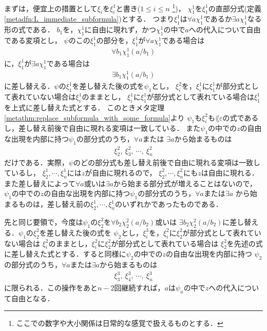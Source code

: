 	まずは，便宜上の措置として$\xi_{i}$を$\xi_{i}^{1}$と書き($1 \leq i \leq n$
	\footnote{
		ここでの数字や大小関係は日常的な感覚で扱えるものとする．
	})，
	$\chi_{1}^{1}$を$\xi_{1}^{1}$の直部分式(定義\ref{metadfn:L_immediate_subformula})とする．
	つまり$\xi_{1}^{1}$は$\forall a \chi_{1}^{1}$であるか$\exists a \chi_{1}^{1}$なる形の式である．
	$b_{1}$を，$\chi_{1}^{1}$に自由に現れず，かつ$\chi_{1}^{1}$の中で$a$への代入について自由である変項とし，
	$\psi$のこの$\xi_{1}^{1}$の部分を，$\xi_{1}^{1}$が$\forall a \chi_{1}^{1}$である場合は
	\begin{align}
		\forall b_{1} \chi_{1}^{1}(a/b_{1})
	\end{align}
	に，$\xi_{1}^{1}$が$\exists a \chi_{1}^{1}$である場合は
	\begin{align}
		\exists b_{1} \chi_{1}^{1}(a/b_{1})
	\end{align}
	に差し替える．$\psi$の$\xi_{1}^{1}$を差し替えた後の式を$\psi_{1}$とし，
	$\xi_{i}^{2}$を，$\xi_{i}^{1}$に$\xi_{1}^{1}$が部分式として表れていない場合は$\xi_{i}^{1}$のままとし，
	$\xi_{i}^{1}$に$\xi_{1}^{1}$が部分式として表れている場合は$\xi_{1}^{1}$を上式に差し替えた式とする．
	このときメタ定理\ref{metathm:replace_subformula_with_some_formula}より
	$\psi_{1}$も$\xi_{i}^{2}$も$\lang{\varepsilon}$の式であるし，差し替え前後で自由に現れる変項は一致している．
	また$\psi_{1}$の中での$z$の自由な出現を内部に持つ$\psi_{1}$の部分式のうち，$\forall a$または
	$\exists a$から始まるものは
	\begin{align}
		\xi_{2}^{2},\ \xi_{3}^{2},\ \cdots,\ \xi_{n}^{2}
	\end{align}
	だけである．実際，$\psi$のどの部分式も差し替え前後で自由に現れる変項は一致しているし，
	$\xi_{2}^{1},\cdots,\xi_{n}^{1}$には$z$が自由に現れるので，
	$\xi_{2}^{2},\cdots,\xi_{n}^{2}$にも$z$は自由に現れる．
	また差し替えによって$\forall a$或いは$\exists a$から始まる部分式が増えることはないので，
	$\psi_{1}$の中での$z$の自由な出現を内部に持つ$\psi_{1}$の部分式のうち，$\forall a$または$\exists a$
	から始まるものは，差し替え前の$\xi_{2}^{1},\cdots,\xi_{n}^{1}$のいずれかであったものである．
	
	先と同じ要領で，今度は$\psi_{1}$の$\xi_{2}^{2}$を$\forall b_{2} \chi_{2}^{2}(a/b_{2})$或いは
	$\exists b_{2}\chi_{2}^{2}(a/b_{2})$に差し替える．$\psi_{1}$の$\xi_{2}^{2}$を差し替えた後の式を
	$\psi_{2}$とし，$\xi_{i}^{3}$を，$\xi_{i}^{2}$に$\xi_{2}^{2}$が部分式として表れていない場合は
	$\xi_{i}^{2}$のままとし，$\xi_{i}^{2}$に$\xi_{2}^{2}$が部分式として表れている場合は
	$\xi_{2}^{2}$を先述の式に差し替えた式とする．すると同様に$\psi_{2}$の中での$z$の自由な出現を内部に持つ
	$\psi_{2}$の部分式のうち，$\forall a$または$\exists a$から始まるものは
	\begin{align}
		\xi_{3}^{3},\ \xi_{4}^{3},\ \cdots,\ \xi_{n}^{3}
	\end{align}
	に限られる．この操作をあと$n-2$回継続すれば，$a$は$\psi_{n}$の中で$z$への代入について自由となる．
	\QED
			
